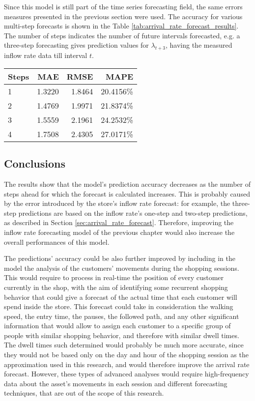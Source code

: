 Since this model is still part of the time series forecasting field, the same errors measures presented in the previous section were used. The accuracy for various multi-step forecasts is shown in the Table \ref{tab:arrival_rate_forecast_results}. The number of steps indicates the number of future intervals forecasted, e.g. a three-step forecasting gives prediction values for \( \lambda_{t+3} \), having the measured inflow rate data till interval \( t \).

\begin{center}
  \begin{tabular}{ l r r r }
    \hline
    Steps & MAE    & RMSE   & MAPE      \\
    \hline
    1     & 1.3220 & 1.8464 & 20.4156\% \\
    2     & 1.4769 & 1.9971 & 21.8374\% \\
    3     & 1.5559 & 2.1961 & 24.2532\% \\
    4     & 1.7508 & 2.4305 & 27.0171\% \\
    \hline
  \end{tabular}
\end{center}

\subsection{Conclusions}
The results show that the model’s prediction accuracy decreases as the number of steps ahead for which the forecast is calculated increases. This is probably caused by the error introduced by the store’s inflow rate forecast: for example, the three-step predictions are based on the inflow rate’s one-step and two-step predictions, as described in Section \ref{sec:arrival_rate_forecast}. Therefore, improving the inflow rate forecasting model of the previous chapter would also increase the overall performances of this model.

The predictions’ accuracy could be also further improved by including in the model the analysis of the customers’ movements during the shopping sessions. This would require to process in real-time the position of every customer currently in the shop, with the aim of identifying some recurrent shopping behavior that could give a forecast of the actual time that each customer will spend inside the store. This forecast could take in consideration the walking speed, the entry time, the pauses, the followed path, and any other significant information that would allow to assign each customer to a specific group of people with similar shopping behavior, and therefore with similar dwell times. The dwell times such determined would probably be much more accurate, since they would not be based only on the day and hour of the shopping session as the approximation used in this research, and would therefore improve the arrival rate forecast. However, these types of advanced analyses would require high-frequency data about the asset’s movements in each session and different forecasting techniques, that are out of the scope of this research.

